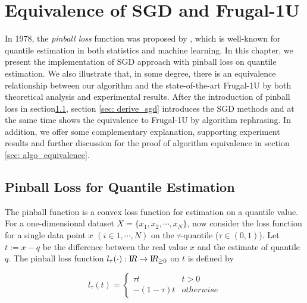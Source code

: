 \chapter{Equivalence of SGD and Frugal-1U}
\label{ch: algo_equal}
           
In 1978, the \textit{pinball loss} function was proposed by \citeauthor{koenkerRegressionQuantiles1978}\cite{koenkerRegressionQuantiles1978}, which is well-known for quantile estimation in both statistics and machine learning. In this chapter, we present the implementation of SGD approach with pinball loss on quantile estimation. We also illustrate that, in some degree, there is an equivalence relationship between our algorithm and the state-of-the-art Frugal-1U\cite{maFrugalStreamingEstimating2014} by both theoretical analysis and experimental results. After the introduction of pinball loss in section\ref{sec: pinball_loss}, section \ref{sec: derive_sgd} introduces the SGD methods and at the same time shows the equivalence to Frugal-1U by algorithm rephrasing. In addition, we offer some complementary explanation, supporting experiment results and further discussion for the proof of algorithm equivalence in section \ref{sec: algo_equivalence}.

\section{Pinball Loss for Quantile Estimation}
\label{sec: pinball_loss}
The pinball function is a convex loss function for estimation on a quantile value.
For a one-dimensional dataset $X = \{x_1, x_2, \cdots, x_N\}$, 
now consider the loss function for a single data point $x$ $(i \in {1, \cdots, N})$ on the $\tau$-quantile ($\tau \in (0,1)$).
Let $t := x - q$ be the difference between the real value $x$ and the estimate of quantile $q$.
The pinball loss function $l_{\tau}(\cdot): \mathrm I\!R \to \mathrm I\!R_{\geq 0}$ on $t$ is defined by

\begin{equation}
    l_\tau(t)= 
        \begin{cases}
            \tau t & t > 0\\
            -(1-\tau) t & otherwise
        \end{cases}
\end{equation}


